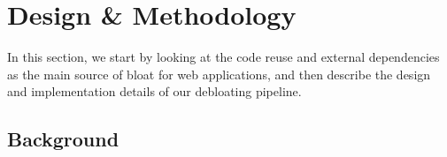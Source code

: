 
\chapter{Design \& Methodology\label{ch:usage}}
In this section, we start by looking at the code reuse and external dependencies as the main source of bloat for web applications, and then describe the design and implementation details of our debloating pipeline.
\section{Background}



